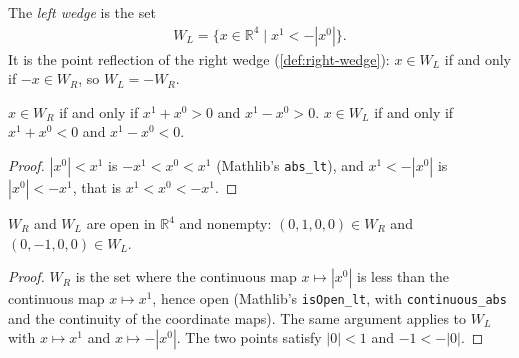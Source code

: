 \begin{definition}
    \label{def:left-wedge}
    \leanok
    The \emph{left wedge} is the set
    \begin{align}
        W_L = \{ x \in \mathbb{R}^4 \mid x^1 < -|x^0| \}.
    \end{align}
    It is the point reflection of the right wedge (\ref{def:right-wedge}): $x \in W_L$ if and only if $-x \in W_R$, so $W_L = -W_R$.
\end{definition}

\begin{lemma}
    \label{lmm:wedge-light-cone-coordinates}
    \leanok
    $x \in W_R$ if and only if $x^1 + x^0 > 0$ and $x^1 - x^0 > 0$. $x \in W_L$ if and only if $x^1 + x^0 < 0$ and $x^1 - x^0 < 0$.
\end{lemma}
\begin{proof}
    \leanok
    $|x^0| < x^1$ is $-x^1 < x^0 < x^1$ (Mathlib's \texttt{abs\_lt}), and $x^1 < -|x^0|$ is $|x^0| < -x^1$, that is $x^1 < x^0 < -x^1$.
\end{proof}

\begin{lemma}
    \label{lmm:wedge-open-nonempty}
    \leanok
    $W_R$ and $W_L$ are open in $\mathbb{R}^4$ and nonempty: $(0, 1, 0, 0) \in W_R$ and $(0, -1, 0, 0) \in W_L$.
\end{lemma}
\begin{proof}
    \leanok
    $W_R$ is the set where the continuous map $x \mapsto |x^0|$ is less than the continuous map $x \mapsto x^1$, hence open (Mathlib's \texttt{isOpen\_lt}, with \texttt{continuous\_abs} and the continuity of the coordinate maps). The same argument applies to $W_L$ with $x \mapsto x^1$ and $x \mapsto -|x^0|$. The two points satisfy $|0| < 1$ and $-1 < -|0|$.
\end{proof}

